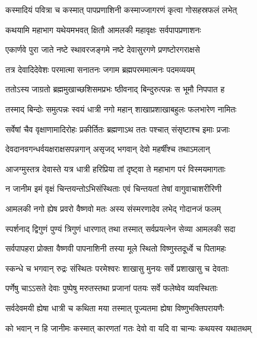 \twolineshloka
{कस्मादियं पवित्रा च कस्मात् पापप्रणाशिनी}
{कस्माज्जागरणं कृत्वा गोसहस्रफलं लभेत्}%


\twolineshloka
{कथयामि महाभाग यथेयमभवत् क्षितौ}
{आमलकी महावृक्षः सर्वपापप्रणाशनः}%

\twolineshloka
{एकार्णवे पुरा जाते नष्टे स्थावरजङ्गमे}
{नष्टे देवासुरगणे प्रणष्टोरगराक्षसे}%

\twolineshloka
{तत्र देवादिदेवेशः परमात्मा सनातनः}
{जगाम ब्रह्मपरममात्मनः पदमव्ययम्}%

\twolineshloka
{ततोऽस्य जाग्रतो ब्रह्ममुखाच्छशिसमप्रभः}
{ष्ठीवनाद् बिन्दुरुत्पन्नः स भूमौ निपपात ह}%

\twolineshloka
{तस्माद् बिन्दोः समुत्पन्नः स्वयं धात्री नगो महान्}
{शाखाप्रशाखाबहुलः फलभारेण नामितः}%

\twolineshloka
{सर्वेषां चैव वृक्षाणामादिरोहः प्रकीर्तितः}
{ब्रह्मणाऽथ ततः पश्चात् संसृष्टाश्च इमाः प्रजाः}%

\twolineshloka
{देवदानवगन्धर्वयक्षराक्षसपन्नगान्}
{असृजद् भगवान् देवो महर्षींश्च तथाऽमलान्}%

\twolineshloka
{आजग्मुस्तत्र देवास्ते यत्र धात्री हरिप्रिया}
{तां दृष्ट्वा ते महाभाग परं विस्मयमागताः}%

\twolineshloka
{न जानीम इमं वृक्षं चिन्तयन्तोऽभिसंस्थिताः}
{एवं चिन्तयतां तेषां वागुवाचाशरीरिणी}%

\twolineshloka
{आमलकी नगो ह्येष प्रवरो वैष्णवो मतः}
{अस्य संस्मरणादेव लभेद् गोदानजं फलम्}%

\twolineshloka
{स्पर्शनाद् द्विगुणं पुण्यं त्रिगुणं धारणात् तथा}
{तस्मात् सर्वप्रयत्नेन सेव्या आमलकी सदा}%

\twolineshloka
{सर्वपापहरा प्रोक्ता वैष्णवी पापनाशिनी}
{तस्या मूले स्थितो विष्णुस्तदूर्ध्वे च पितामहः}%

\twolineshloka
{स्कन्धे च भगवान् रुद्रः संस्थितः परमेश्वरः}
{शाखासु मुनयः सर्वे प्रशाखासु च देवताः}%

\twolineshloka
{पर्णेषु चाऽऽसते देवाः पुष्पेषु मरुतस्तथा}
{प्रजानां पतयः सर्वे फलेष्वेव व्यवस्थिताः}%

\twolineshloka
{सर्वदेवमयी ह्येषा धात्री च कथिता मया}
{तस्मात् पूज्यतमा ह्येषा विष्णुभक्तिपरायणैः}%


\twolineshloka
{को भवान् न हि जानीमः कस्मात् कारणतां गतः}
{देवो वा यदि वा चान्यः कथयस्व यथातथम्}%


